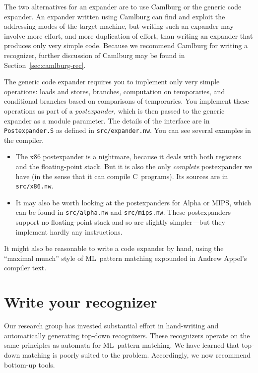 \documentclass[12pt]{article}
\begin{document}
The two alternatives for an expander are to use Camlburg or the
generic code expander.
An expander written using Camlburg can find and exploit the
addressing modes of the target machine, but writing such an expander
may involve more effort, and more duplication of effort, than writing
an expander that produces only very simple code.
Because we recommend Camlburg for writing a recognizer, further
discussion of Camlburg may be found in Section~\ref{sec:camlburg-rec}.

The generic code expander requires you to implement only very simple
operations: loads and stores, branches, computation on temporaries, and
conditional branches based on comparisons of temporaries.
You implement these operations as part of a \emph{postexpander}, which
is then passed to the generic expander as a module parameter.
The details of the interface are in \texttt{Postexpander.S} as
defined in \texttt{src/expander.nw}.
You can see several examples in the compiler.
\begin{itemize}
\item
The x86 postexpander is a nightmare, because it deals with both
registers and the floating-point stack.
But it is also the only \emph{complete} postexpander we have (in the
sense that it can compile C~programs).
Its sources are in \texttt{src/x86.nw}.
\item
It may also be worth looking at the postexpanders for Alpha or MIPS,
which can be found in \texttt{src/alpha.nw} and \texttt{src/mips.nw}.
These postexpanders support no floating-point stack and so are
slightly simpler---but they implement hardly any instructions.
\end{itemize}
It might also be reasonable to write a code expander by hand, using
the ``maximal munch'' style of ML~pattern matching expounded in Andrew
Appel's compiler text.

\section{Write your recognizer}

Our research group has invested substantial effort in hand-writing and
automatically generating top-down recognizers.
These recognizers operate on the same principles as automata for
ML~pattern matching.
We have learned that top-down matching is poorly suited to the
problem.
Accordingly, we now recommend bottom-up tools.

\label{sec:camlburg-rec}
\end{document}
